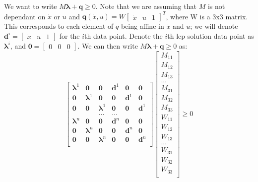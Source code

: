 \documentclass{article}
\renewcommand{\vec}[1]{\boldsymbol{#1}}
\newcommand{\rvec}[1]{\begin{bmatrix} #1 \end{bmatrix}}
\begin{document}
We want to write $M \vec{\lambda} + \vec{q} \geq 0$. Note that we are assuming that $M$ is not dependant on $\dot x$ or $u$ and $\vec{q}(\dot x, u) = W \rvec{\dot x & u & 1}^T$, where W is a 3x3 matrix. This corresponds to each element of $q$ being affine in $\dot x$ and $u$; we will denote $\vec{d}^i = \rvec{\dot x & u & 1}$ for the $i$th data point. Denote the $i$th lcp solution data point as $\vec{\lambda}^i$, and $\vec{0} = \rvec{0 & 0 & 0}$. We can then write $M \vec{\lambda} + \vec{q} \geq 0$ as:
\[
    \begin{bmatrix}
        \vec{\lambda} ^1 & \vec{0} & \vec{0} & \vec{d}^1 & \vec{0} & \vec{0} \\
        \vec{0} & \vec{\lambda} ^1 & \vec{0} & \vec{0} & \vec{d}^1 & \vec{0} \\
        \vec{0} & \vec{0} & \vec{\lambda} ^1 & \vec{0} & \vec{0} & \vec{d}^1 \\
                & & \dots & \dots & & \\
        \vec{\lambda} ^n & \vec{0} & \vec{0} & \vec{d}^n & \vec{0} & \vec{0} \\
        \vec{0} & \vec{\lambda} ^n & \vec{0} & \vec{0} & \vec{d}^n & \vec{0} \\
        \vec{0} & \vec{0} & \vec{\lambda} ^n & \vec{0} & \vec{0} & \vec{d}^n \\
    \end{bmatrix}
    \begin{bmatrix}
        M_{11} \\
        M_{12} \\
        M_{13} \\
        \dots \\
        M_{31} \\
        M_{32} \\
        M_{33} \\
        W_{11} \\
        W_{12} \\
        W_{13} \\
        \dots \\
        W_{31} \\
        W_{32} \\
        W_{33} \\
    \end{bmatrix}
    \geq 0
\]
\end{document}
